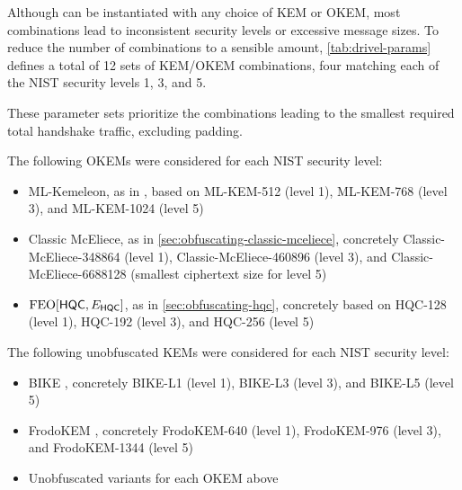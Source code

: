 Although \drivel{} can be instantiated with any choice of KEM or OKEM, most combinations lead to inconsistent security levels or excessive message sizes. To reduce the number of combinations to a sensible amount, \cref{tab:drivel-params} defines a total of 12 sets of KEM/OKEM combinations, four matching each of the NIST security levels 1, 3, and 5.

These parameter sets prioritize the combinations leading to the smallest required total handshake traffic, excluding padding.

The following OKEMs were considered for each NIST security level:
\begin{itemize}
    \item ML-Kemeleon, as in \cite{irtf-cfrg-kemeleon-00}, based on ML-KEM-512 (level 1), ML-KEM-768 (level 3), and ML-KEM-1024 (level 5)
    \item Classic McEliece, as in \cref{sec:obfuscating-classic-mceliece}, concretely Classic-McEliece-348864 (level 1), Classic-McEliece-460896 (level 3), and Classic-McEliece-6688128 (smallest ciphertext size for level 5)
    \item $\textsf{\textnormal{FEO}}[\mathsf{HQC}, E_\mathsf{HQC}]$, as in \cref{sec:obfuscating-hqc}, concretely based on HQC-128 (level 1), HQC-192 (level 3), and HQC-256 (level 5)
\end{itemize}

The following unobfuscated KEMs were considered for each NIST security level:
\begin{itemize}
    \item BIKE \cite{NISTPQC-R4:BIKE22}, concretely BIKE-L1 (level 1), BIKE-L3 (level 3), and BIKE-L5 (level 5)
    \item FrodoKEM \cite{NISTPQC-R3:FrodoKEM20}, concretely FrodoKEM-640 (level 1), FrodoKEM-976 (level 3), and FrodoKEM-1344 (level 5)
    \item Unobfuscated variants for each OKEM above 
\end{itemize}

